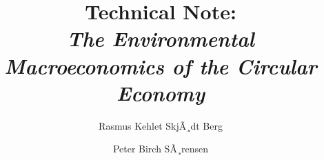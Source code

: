 ﻿\documentclass[a4paper]{article}
\begin{document}

\title{Technical Note: \\
\emph{The Environmental Macroeconomics of the Circular Economy}}

\author{Rasmus Kehlet SkjÃ¸dt Berg
\and
Peter Birch SÃ¸rensen
}
\maketitle








\end{document}
